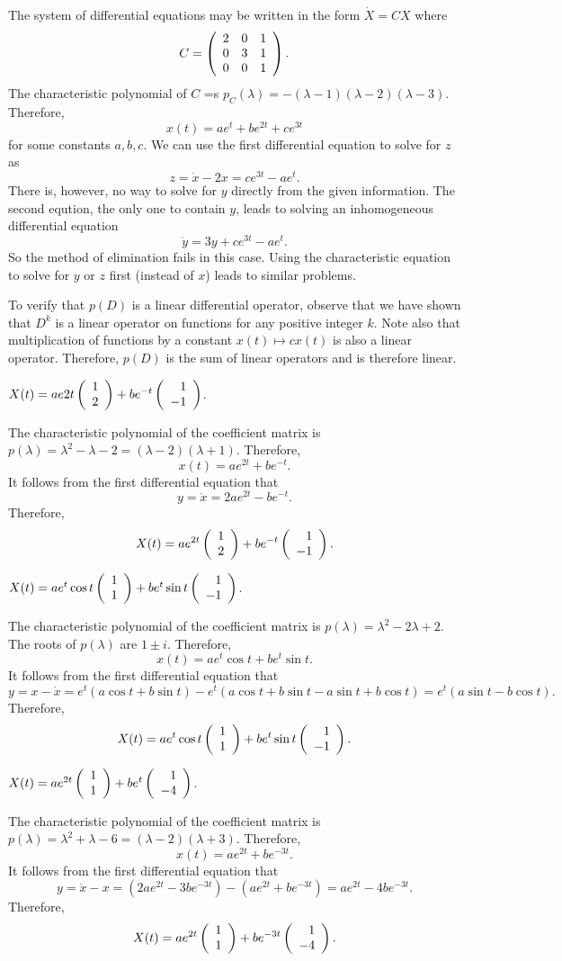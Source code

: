 The system of differential equations may be written in the form $\dot{X}=CX$ where
\[
C=\left(\begin{array}{rrr} 2 & 0 & 1 \\ 0 & 3 & 1 \\ 0 & 0 & 1\end{array}\right).
\]
The characteristic polynomial of $C$ =s
$p_C(\lambda)=-(\lambda-1)(\lambda-2)(\lambda-3)$.  Therefore, 
\[
x(t) = ae^t+be^{2t}+ce^{3t}
\]
for some constants $a,b,c$.  We can use the first differential equation to solve for
$z$ as
\[
z = \dot{x}-2x = ce^{3t}-ae^t.
\]
There is, however, no way to solve for $y$ directly from the given information.  The
second eqution, the only one to contain $y$, leads to solving an inhomogeneous
differential equation
\[
\dot{y} = 3y + ce^{3t}-ae^t.
\]
So the method of elimination fails in this case.  Using the characteristic equation
to solve for $y$ or $z$ first (instead of $x$) leads to similar problems. 


To verify that $p(D)$ is a linear differential operator, observe that we have shown 
that $D^k$ is a linear operator on functions for any positive integer $k$.  Note also
that multiplication of functions by a constant $x(t)\mapsto cx(t)$ is also a linear
operator.  Therefore, $p(D)$ is the sum of linear operators and is therefore linear.


 \ans $X(t) = ae{2t}\left(\begin{array}{r} 1 \\ 2\end{array}\right) + be^{-t}\left(\begin{array}{r} 1 \\ -1\end{array}\right)$.

\soln  The characteristic polynomial of the coefficient matrix is 
$p(\lambda) = \lambda^2-\lambda-2=(\lambda-2)(\lambda+1)$.  Therefore, 
\[
x(t) = ae^{2t}+be^{-t}.
\]
It follows from the first differential equation that 
\[
y = \dot{x} = 2ae^{2t}-be^{-t}.
\]
Therefore,
\[
X(t) = ae^{2t}\left(\begin{array}{r} 1 \\ 2\end{array}\right) + be^{-t}\left(\begin{array}{r} 1 \\ -1\end{array}\right).
\]


  \ans $X(t) = ae^t\cos t\left(\begin{array}{r} 1 \\ 1\end{array}\right) + be^t\sin t\left(\begin{array}{r} 1 \\ -1\end{array}\right)$.

\soln  The characteristic polynomial of the coefficient matrix is 
$p(\lambda) = \lambda^2-2\lambda+2$.  The roots of $p(\lambda)$ are $1\pm i$. 
Therefore, 
\[
x(t) = ae^t\cos t+be^t\sin t.
\]
It follows from the first differential equation that 
\[
y = x-\dot{x} = e^t(a\cos t+b\sin t) - e^t(a\cos t+b\sin t-a\sin t+b\cos t)
=e^t(a\sin t-b\cos t).
\]
Therefore,
\[
X(t) = ae^t\cos t\left(\begin{array}{r} 1 \\ 1\end{array}\right) + be^t\sin t\left(\begin{array}{r} 1 \\ -1\end{array}\right).
\]


 \ans $X(t) = ae^{2t}\left(\begin{array}{r} 1 \\ 1\end{array}\right) + be^t\left(\begin{array}{r} 1 \\ -4\end{array}\right)$.

\soln  The characteristic polynomial of the coefficient matrix is 
$p(\lambda) = \lambda^2+\lambda-6=(\lambda-2)(\lambda+3)$.  Therefore, 
\[
x(t) = ae^{2t}+be^{-3t}.
\]
It follows from the first differential equation that 
\[
y =\dot{x}-x = (2ae^{2t}-3be^{-3t})-(ae^{2t}+be^{-3t}) = ae^{2t}-4be^{-3t}.
\]
Therefore,
\[
X(t) = ae^{2t}\left(\begin{array}{r} 1 \\ 1\end{array}\right) + be^{-3t}\left(\begin{array}{r} 1 \\ -4\end{array}\right).
\]


